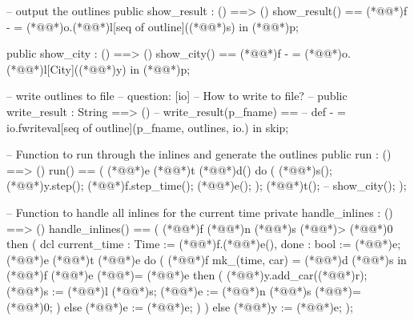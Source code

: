 \documentclass[a4paper]{article}
\begin{document}
\begin{vdm_al}
    -- output the outlines
    public show_result : () ==> ()
    show_result() ==
        (*@@*)f - = (*@@*)o.(*@@*)l[seq of outline]((*@@*)s) in (*@@*)p;
    
    public show_city : () ==> ()
    show_city() ==
        (*@@*)f - = (*@@*)o.(*@@*)l[City]((*@@*)y) in (*@@*)p;

    -- write outlines to file
    -- question: [io]
    --           How to write to file?
    -- public write_result : String ==> ()
    -- write_result(p_fname) ==
    --     def - = io.fwriteval[seq of outline](p_fname, outlines, io.) in skip;
    
    -- Function to run through the inlines and generate the outlines
    public run : () ==> ()
    run() == (
        (*@@*)e (*@@*)t (*@@*)d() do (
            (*@@*)s();
            (*@@*)y.step();
            (*@@*)f.step_time();
            (*@@*)e();
        );
        (*@@*)t();
        -- show_city();
    );

    -- Function to handle all inlines for the current time
    private handle_inlines : () ==> ()
    handle_inlines() == (
        (*@@*)f (*@@*)n (*@@*)s (*@\vdmnotcovered{}@*)> (*@\vdmnotcovered{}@*)0 then (
            dcl current_time : Time := (*@@*)f.(*@@*)e(),
                done : bool := (*@@*)e;
            (*@@*)e (*@@*)t (*@@*)e do (
                (*@@*)f mk_(time, car) = (*@@*)d (*@@*)s in
                    (*@@*)f (*@@*)e (*@\vdmnotcovered{<}@*)= (*@@*)e then (
                        (*@@*)y.add_car((*@@*)r);
                        (*@@*)s := (*@@*)l (*@@*)s;
                        (*@@*)e := (*@@*)n (*@@*)s (*@\vdmnotcovered{}@*)= (*@\vdmnotcovered{}@*)0;
                    )
                    else (*@@*)e := (*@@*)e;
            )
        )
        else (*@@*)y := (*@@*)e;
    );


\end{vdm_al}
\end{document}
